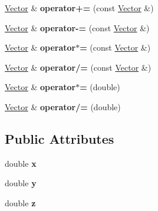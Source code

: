 \begin{DoxyCompactItemize}
\item 
\hypertarget{class_vector_a669208fe9ad795111df6a54683563c6d}{
\hyperlink{class_vector}{\-Vector} \& {\bfseries operator+=} (const \hyperlink{class_vector}{\-Vector} \&)}
\label{class_vector_a669208fe9ad795111df6a54683563c6d}

\item 
\hypertarget{class_vector_abc58d82a7f0ec941d4f4d66012cf5e83}{
\hyperlink{class_vector}{\-Vector} \& {\bfseries operator-\/=} (const \hyperlink{class_vector}{\-Vector} \&)}
\label{class_vector_abc58d82a7f0ec941d4f4d66012cf5e83}

\item 
\hypertarget{class_vector_aa0ffd0237c0ba122b2a56fb84cdf5378}{
\hyperlink{class_vector}{\-Vector} \& {\bfseries operator$\ast$=} (const \hyperlink{class_vector}{\-Vector} \&)}
\label{class_vector_aa0ffd0237c0ba122b2a56fb84cdf5378}

\item 
\hypertarget{class_vector_a7e0eaf65ee4c031c1a2f1868ce715761}{
\hyperlink{class_vector}{\-Vector} \& {\bfseries operator/=} (const \hyperlink{class_vector}{\-Vector} \&)}
\label{class_vector_a7e0eaf65ee4c031c1a2f1868ce715761}

\item 
\hypertarget{class_vector_a5e9a64ca63bfbbd1a49c34fd10507459}{
\hyperlink{class_vector}{\-Vector} \& {\bfseries operator$\ast$=} (double)}
\label{class_vector_a5e9a64ca63bfbbd1a49c34fd10507459}

\item 
\hypertarget{class_vector_a44879c9208fb830aa748fcf654776ebd}{
\hyperlink{class_vector}{\-Vector} \& {\bfseries operator/=} (double)}
\label{class_vector_a44879c9208fb830aa748fcf654776ebd}

\end{DoxyCompactItemize}
\subsection*{\-Public \-Attributes}
\begin{DoxyCompactItemize}
\item 
\hypertarget{class_vector_a133722e00601091cb2075219da5da6e4}{
double {\bfseries x}}
\label{class_vector_a133722e00601091cb2075219da5da6e4}

\item 
\hypertarget{class_vector_a09a21a140718f234eea348d5058cee0b}{
double {\bfseries y}}
\label{class_vector_a09a21a140718f234eea348d5058cee0b}

\item 
\hypertarget{class_vector_a1b604d674485316754b72494f5fcc960}{
double {\bfseries z}}
\label{class_vector_a1b604d674485316754b72494f5fcc960}

\end{DoxyCompactItemize}

